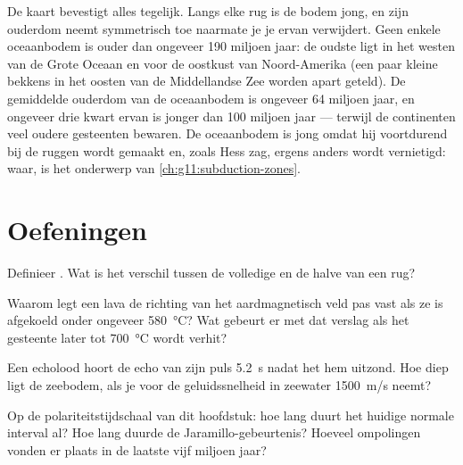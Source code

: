 De kaart bevestigt alles tegelijk. Langs elke rug is de bodem jong, en zijn
ouderdom neemt symmetrisch toe naarmate je je ervan verwijdert. Geen enkele
oceaanbodem is ouder dan ongeveer \num{190} miljoen jaar: de oudste ligt in het
westen van de Grote Oceaan en voor de oostkust van Noord-Amerika (een paar kleine
bekkens in het oosten van de Middellandse Zee worden apart geteld). De gemiddelde
ouderdom van de oceaanbodem is ongeveer \num{64} miljoen jaar, en ongeveer drie
kwart ervan is jonger dan 100 miljoen jaar --- terwijl de continenten veel oudere
gesteenten bewaren. De oceaanbodem is jong omdat hij voortdurend bij de ruggen
wordt gemaakt en, zoals Hess zag, ergens anders wordt vernietigd: waar, is het
onderwerp van \cref{ch:g11:subduction-zones}.

\section{Oefeningen}

\begin{exercise}[$\star$]\label{exo:g11:drift-to-spreading:1}
Definieer . Wat is het verschil tussen de volledige en de
halve  van een rug?
\end{exercise}

\begin{exercise}[$\star$]\label{exo:g11:drift-to-spreading:2}
Waarom legt een lava de richting van het aardmagnetisch veld pas vast als ze is
afgekoeld onder ongeveer \qty{580}{\celsius}? Wat gebeurt er met dat verslag als
het gesteente later tot \qty{700}{\celsius} wordt verhit?
\end{exercise}

\begin{exercise}[$\star$]\label{exo:g11:drift-to-spreading:3}
Een echolood hoort de echo van zijn puls \qty{5.2}{s} nadat het hem uitzond.
Hoe diep ligt de zeebodem, als je voor de geluidssnelheid in zeewater
\qty{1500}{m/s} neemt?
\end{exercise}

\begin{exercise}[$\star$]\label{exo:g11:drift-to-spreading:4}
Op de polariteitstijdschaal van dit hoofdstuk: hoe lang duurt het huidige normale
interval al? Hoe lang duurde de Jaramillo-gebeurtenis? Hoeveel ompolingen vonden
er plaats in de laatste vijf miljoen jaar?
\end{exercise}

